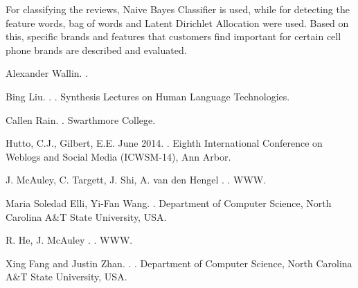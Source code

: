 \documentclass[11pt]{article}
\begin{document}
  For classifying the reviews, Naive Bayes Classifier is used, while for detecting the feature words, bag of words and Latent Dirichlet Allocation were used. Based on this, specific brands and features that customers find important for certain cell phone brands are described and evaluated.  
  
 
  
  \begin{thebibliography}{}
  
  Alexander Wallin.
  .
  
  
  Bing Liu.
  .
  .
  \newblock Synthesis Lectures on Human Language Technologies.
  
  
  Callen Rain.
  .
  \newblock Swarthmore College.


  Hutto, C.J., Gilbert, E.E.
  \newblock June 2014.
  .
  \newblock Eighth International Conference on Weblogs and Social Media (ICWSM-14), Ann Arbor.


  J. McAuley, C. Targett, J. Shi, A. van den Hengel
  .
  .
  \newblock WWW.
  
  
  Maria Soledad Elli, Yi-Fan Wang.
  .
  \newblock Department of Computer Science, North Carolina A\&T State University, USA.


  R. He, J. McAuley
  .
  .
  \newblock WWW.

  
  Xing Fang and Justin Zhan.
  .
  .
  \newblock Department of Computer Science, North Carolina A\&T State University, USA.
  

  

  
  
  
  \end{thebibliography}


  
\end{document}
